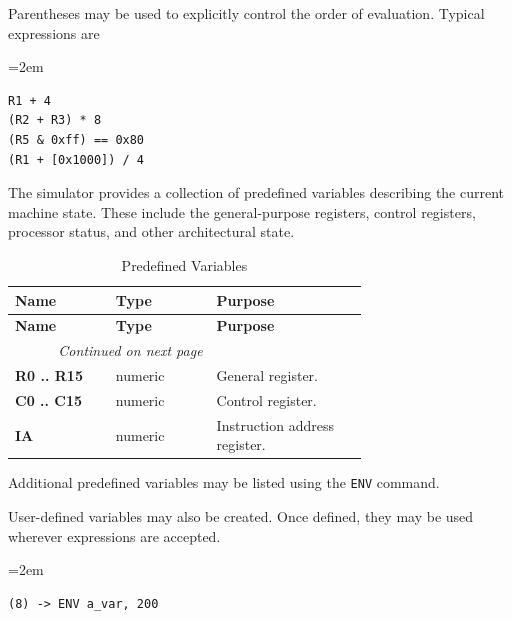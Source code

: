 Parentheses may be used to explicitly control the order of evaluation. Typical expressions are

\begin{list}{}{\leftmargin=2em}
\item
\begin{verbatim}
R1 + 4
(R2 + R3) * 8
(R5 & 0xff) == 0x80
(R1 + [0x1000]) / 4
\end{verbatim}
\end{list}


The simulator provides a collection of predefined variables describing the current machine state. These include the general-purpose registers, control registers, processor status, and other architectural state.

\begin{longtable}{@{}p{0.2\linewidth}p{0.2\linewidth}p{0.3\linewidth}@{}}
    \caption{Predefined Variables} \\
    \toprule
    \textbf{Name} & \textbf{Type} & \textbf{Purpose} \\
    \midrule
    \endfirsthead
    \toprule
     \textbf{Name} & \textbf{Type} & \textbf{Purpose} \\
    \midrule
    \endhead
    \midrule
    \multicolumn{2}{r}{\textit{Continued on next page}} \\
    \midrule
    \endfoot
    \bottomrule
    \endlastfoot
    \textbf{R0 .. R15} & numeric & General register. \\
    \midrule
    \textbf{C0 .. C15} & numeric & Control register. \\
    \midrule
    \textbf{IA} & numeric & Instruction address register. \\
    \midrule
\end{longtable}

Additional predefined variables may be listed using the \texttt{ENV} command. 


User-defined variables may also be created. Once defined, they may be used wherever expressions are accepted.

\begin{list}{}{\leftmargin=2em}
\item
\begin{verbatim}
(8) -> ENV a_var, 200
\end{verbatim}
\end{list}

